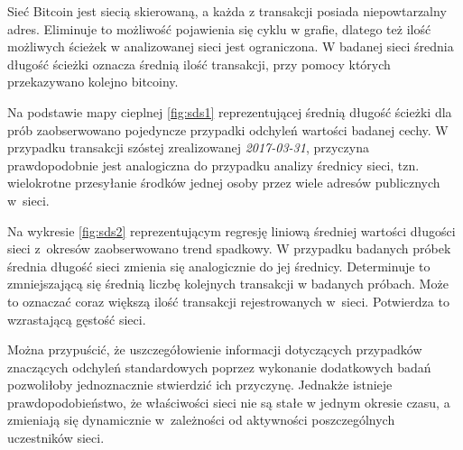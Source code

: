 \documentclass[12pt, twoside, final, openany]{mgr}
\begin{document}
\indent Sieć Bitcoin jest siecią skierowaną, a każda z transakcji posiada niepowtarzalny adres. Eliminuje to możliwość pojawienia się cyklu w grafie, dlatego też ilość możliwych ścieżek w analizowanej sieci jest ograniczona. W badanej sieci średnia długość ścieżki oznacza średnią ilość transakcji, przy pomocy których przekazywano kolejno bitcoiny.

\indent Na podstawie mapy cieplnej \ref{fig:sds1} reprezentującej średnią długość ścieżki dla prób zaobserwowano pojedyncze przypadki odchyleń wartości badanej cechy. W przypadku transakcji szóstej zrealizowanej \textit{2017-03-31}, przyczyna prawdopodobnie jest analogiczna do przypadku analizy średnicy sieci, tzn. wielokrotne przesyłanie środków jednej osoby przez wiele adresów publicznych w~sieci.

\indent Na wykresie \ref{fig:sds2} reprezentującym regresję liniową średniej wartości długości sieci z~okresów zaobserwowano trend spadkowy. W przypadku badanych próbek średnia długość sieci zmienia się analogicznie do jej średnicy. Determinuje to zmniejszającą się średnią liczbę kolejnych transakcji w badanych próbach. Może to oznaczać coraz większą ilość transakcji rejestrowanych w~sieci. Potwierdza to wzrastającą gęstość sieci.

\indent Można przypuścić, że uszczegółowienie informacji dotyczących przypadków znaczących odchyleń standardowych poprzez wykonanie dodatkowych badań pozwoliłoby jednoznacznie stwierdzić ich przyczynę. Jednakże istnieje prawdopodobieństwo, że właściwości sieci nie są stałe w jednym okresie czasu, a zmieniają się dynamicznie w~zależności od aktywności poszczególnych uczestników sieci.
\end{document}
